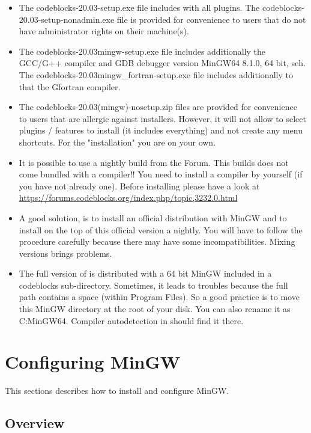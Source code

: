 \begin{itemize}
\item The codeblocks-20.03-setup.exe file includes \codeblocks with all plugins. The codeblocks-20.03-setup-nonadmin.exe file is provided for convenience to users that do not have administrator rights on their machine(s).
\item The codeblocks-20.03mingw-setup.exe file includes additionally the GCC/G++ compiler and GDB debugger version MinGW64 8.1.0, 64 bit, seh. The codeblocks-20.03mingw\_fortran-setup.exe file includes additionally to that the Gfortran compiler.
\item The codeblocks-20.03(mingw)-nosetup.zip files are provided for convenience to users that are allergic against installers. However, it will not allow to select plugins / features to install (it includes everything) and not create any menu shortcuts. For the "installation" you are on your own.
\item It is possible to use a nightly build from the Forum. This builds does not come bundled with a compiler!! You need to install a compiler by yourself (if you have not already one). Before installing please have a look at \url{https://forums.codeblocks.org/index.php/topic,3232.0.html} 
\item A good solution, is to install an official distribution with MinGW and to install on the top of this official version a nightly. You will have to follow the procedure carefully because there may have some incompatibilities. Mixing versions brings problems. 
\item The full version of \codeblocks is distributed with a 64 bit MinGW included in a codeblocks sub-directory. Sometimes, it leads to troubles because the full path contains a space (within Program Files). So a good practice is to move this MinGW directory at the root of your disk. You can also rename it as C:\osp MinGW64. Compiler autodetection in \codeblocks should find it there.
\end{itemize}

\section{Configuring MinGW}

This sections describes how to install and configure MinGW.

\subsection{Overview}

